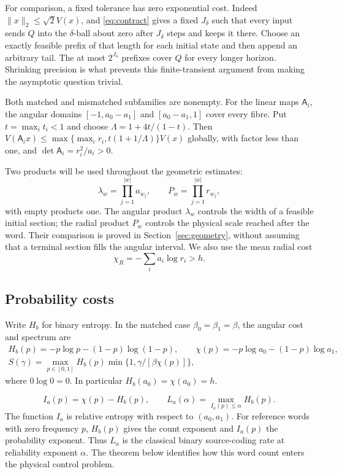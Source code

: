 \documentclass[11pt]{amsart}
\theoremstyle{definition}
\theoremstyle{remark}
\numberwithin{equation}{section}
\begin{document}
For comparison, a fixed tolerance has zero exponential cost.
Indeed $\|x\|_2\le\sqrt2 V(x)$, and \eqref{eq:contract} gives a
fixed $J_\delta$ such that every input sends $Q$ into the
$\delta$-ball about zero after $J_\delta$ steps and keeps it there.
Choose an exactly feasible prefix of that length for each initial
state and then append an arbitrary tail. The at most
$2^{J_\delta}$ prefixes cover $Q$ for every longer horizon.
Shrinking precision is what prevents this finite-transient
argument from making the asymptotic question trivial.

Both matched and mismatched subfamilies are nonempty. For the linear
maps $\mathsf A_i$, the angular domains
$[-1,a_0-a_1]$ and $[a_0-a_1,1]$ cover every fibre.
Put $t=\max_i t_i<1$ and choose $\Lambda=1+4t/(1-t)$.
Then $V(\mathsf A_i x)\le
\max\{\max_i r_i,t(1+1/\Lambda)\}V(x)$ globally, with factor
less than one, and $\det\mathsf A_i=r_i^2/a_i>0$.

Two products will be used throughout the geometric estimates:
\[
\lambda_w=\prod_{j=1}^{|w|}a_{w_j},\qquad
P_w=\prod_{j=1}^{|w|}r_{w_j},
\]
with empty products one. The angular product $\lambda_w$ controls
the width of a feasible initial section; the radial product $P_w$
controls the physical scale reached after the word. Their comparison
is proved in Section~\ref{sec:geometry}, without assuming that a
terminal section fills the angular interval. We also use the mean
radial cost
\begin{equation}\label{eq:radialparameters}
\chi_R=-\sum_i a_i\log r_i>h.
\end{equation}

\subsection{Probability costs}
Write $H_b$ for binary entropy. In the matched case
$\beta_0=\beta_1=\beta$, the angular cost and spectrum are
\begin{gather}
H_b(p)=-p\log p-(1-p)\log(1-p),\qquad
\chi(p)=-p\log a_0-(1-p)\log a_1,\label{eq:entropycost}\\
S(\gamma)=\max_{p\in[0,1]} H_b(p)
                \min\{1,\gamma/[\beta\chi(p)]\},\label{eq:variational}
\end{gather}
where $0\log0=0$. In particular $H_b(a_0)=\chi(a_0)=h$.

\begin{equation}\label{eq:reliabilityfunction}
I_a(p)=\chi(p)-H_b(p),\qquad
L_a(\alpha)=\max_{I_a(p)\le\alpha}H_b(p).
\end{equation}
The function $I_a$ is relative entropy with respect to $(a_0,a_1)$.
For reference words with zero frequency $p$, $H_b(p)$ gives the
count exponent and $I_a(p)$ the probability exponent. Thus $L_a$
is the classical binary source-coding rate at reliability exponent
$\alpha$. The theorem below identifies how this word count enters
the physical control problem.
\end{document}
